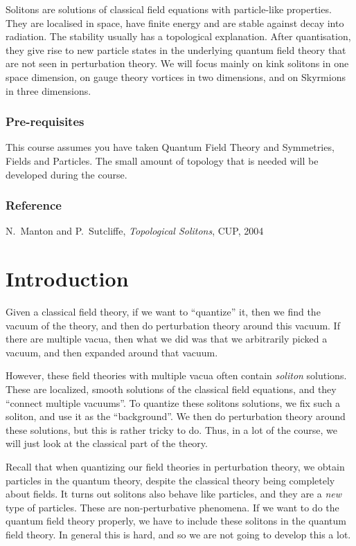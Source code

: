 \documentclass[a4paper]{article}
\begin{document}
\maketitle
{\small
\setlength{\parindent}{0em}
\setlength{\parskip}{1em}
Solitons are solutions of classical field equations with particle-like properties. They are localised in space, have finite energy and are stable against decay into radiation. The stability usually has a topological explanation. After quantisation, they give rise to new particle states in the underlying quantum field theory that are not seen in perturbation theory. We will focus mainly on kink solitons in one space dimension, on gauge theory vortices in two dimensions, and on Skyrmions in three dimensions.

\subsubsection*{Pre-requisites}
This course assumes you have taken Quantum Field Theory and Symmetries, Fields and Particles. The small amount of topology that is needed will be developed during the course.
\subsubsection*{Reference}
N.\ Manton and P.\ Sutcliffe, \emph{Topological Solitons}, CUP, 2004
}
\tableofcontents

\setcounter{section}{-1}
\section{Introduction}
Given a classical field theory, if we want to ``quantize'' it, then we find the vacuum of the theory, and then do perturbation theory around this vacuum. If there are multiple vacua, then what we did was that we arbitrarily picked a vacuum, and then expanded around that vacuum.

However, these field theories with multiple vacua often contain \emph{soliton} solutions. These are localized, smooth solutions of the classical field equations, and they ``connect multiple vacuums''. To quantize these solitons solutions, we fix such a soliton, and use it as the ``background''. We then do perturbation theory around these solutions, but this is rather tricky to do. Thus, in a lot of the course, we will just look at the classical part of the theory.

Recall that when quantizing our field theories in perturbation theory, we obtain particles in the quantum theory, despite the classical theory being completely about fields. It turns out solitons also behave like particles, and they are a \emph{new} type of particles. These are non-perturbative phenomena. If we want to do the quantum field theory properly, we have to include these solitons in the quantum field theory. In general this is hard, and so we are not going to develop this a lot.
\end{document}
